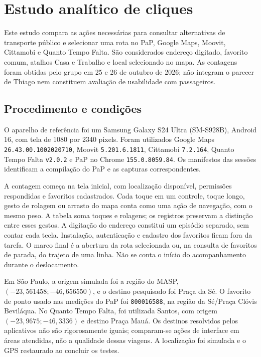 \chapter{Estudo analítico de cliques}
\label{ap:cliques}

Este estudo compara as ações necessárias para consultar alternativas de transporte público e selecionar uma rota no PaP, Google Maps, Moovit, Cittamobi e Quanto Tempo Falta. São considerados endereço digitado, favorito comum, atalhos Casa e Trabalho e local selecionado no mapa. As contagens foram obtidas pelo grupo em 25 e 26 de outubro de 2026; não integram o parecer de Thiago nem constituem avaliação de usabilidade com passageiros.

\section{Procedimento e condições}\label{sec:convencao-acoes}\label{sec:cliques-condicoes}
O aparelho de referência foi um Samsung Galaxy S24 Ultra (SM-S928B), Android 16, com tela de 1080 por 2340 pixels. Foram utilizados Google Maps \nolinkurl{26.43.00.1002020710}, Moovit \nolinkurl{5.201.6.1811}, Cittamobi \nolinkurl{7.2.164}, Quanto Tempo Falta \nolinkurl{v2.0.2} e PaP no Chrome \nolinkurl{155.0.8059.84}. Os manifestos das sessões identificam a compilação do PaP e as capturas correspondentes.

A contagem começa na tela inicial, com localização disponível, permissões respondidas e favoritos cadastrados. Cada toque em um controle, toque longo, gesto de rolagem ou arrasto do mapa conta como uma ação de navegação, com o mesmo peso. A tabela soma toques e rolagens; os registros preservam a distinção entre esses gestos. A digitação do endereço constitui um episódio separado, sem contar cada tecla. Instalação, autenticação e cadastro dos favoritos ficam fora da tarefa. O marco final é a abertura da rota selecionada ou, na consulta de favoritos de parada, do trajeto de uma linha. Não se conta o início do acompanhamento durante o deslocamento.

Em São Paulo, a origem simulada foi a região do MASP, $(-23{,}561458; -46{,}656550)$, e o destino pesquisado foi Praça da Sé. O favorito de ponto usado nas medições do PaP foi \texttt{800016588}, na região da Sé/Praça Clóvis Beviláqua. No Quanto Tempo Falta, foi utilizada Santos, com origem $(-23{,}9675; -46{,}3336)$ e destino Praça Mauá. Os destinos resolvidos pelos aplicativos não são rigorosamente iguais; comparam-se ações de interface em áreas atendidas, não a qualidade dessas viagens. A localização foi simulada e o GPS restaurado ao concluir os testes.

